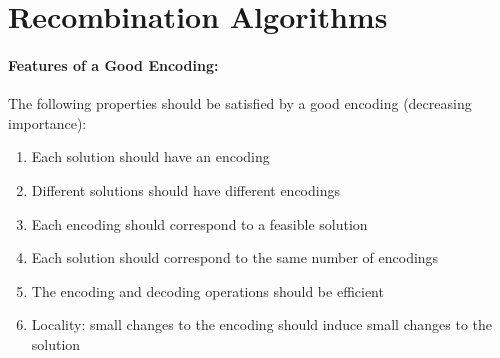 \documentclass{article}
\begin{document}
	\section*{Recombination Algorithms}
	
	\paragraph{Features of a Good Encoding:} The following properties should be satisfied by a good encoding (decreasing importance):
	\begin{enumerate}
		\item Each solution should have an encoding
		\item Different solutions should have different encodings
		\item Each encoding should correspond to a feasible solution
		\item Each solution should correspond to the same number of encodings
		\item The encoding and decoding operations should be efficient
		\item Locality: small changes to the encoding should induce small changes to the solution
	\end{enumerate}
	
	
\end{document}
